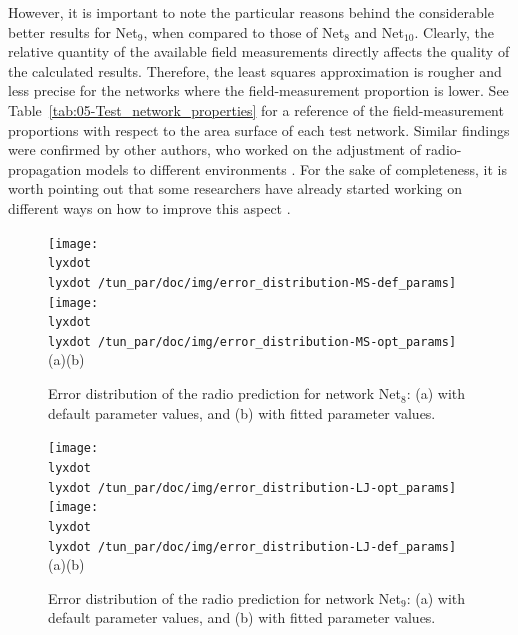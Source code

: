 However, it is important to note the particular reasons behind the
considerable better results for Net$_{9}$, when compared to those
of Net$_{8}$ and Net$_{10}$. Clearly, the relative quantity of the
available field measurements directly affects the quality of the calculated
results. Therefore, the least squares approximation is rougher and
less precise for the networks where the field-measurement proportion
is lower. See Table~\ref{tab:05-Test_network_properties} for a reference
of the field-measurement proportions with respect to the area surface
of each test network. Similar findings were confirmed by other authors,
who worked on the adjustment of radio-propagation models to different
environments \cite{Huang_Online_propagation_model_correction_based_on_PSO_algorithm_in_LTE_SON_system:2012}.
For the sake of completeness, it is worth pointing out that some researchers
have already started working on different ways on how to improve this
aspect \cite{Neuland_Influence_of_Different_Factors_on_X_Map_Estimation_in_LTE:2011,Neuland_Influence_of_positioning_error_on_X_Map_estimation_in_LTE:2011}.

\begin{figure}
\centering

\texttt{[image: \\lyxdot \\lyxdot /tun\_par/doc/img/error\_distribution-MS-def\_params]}\texttt{[image: \\lyxdot \\lyxdot /tun\_par/doc/img/error\_distribution-MS-opt\_params]}\\\hspace*{0.2in}(a)\hspace*{3.2in}(b)

\caption{Error distribution of the radio prediction for network Net$_{8}$:
(a) with default parameter values, and (b) with fitted parameter values.\label{fig:05-Error_distribution_for_Net8}}
\end{figure}


\begin{figure}[h]
\centering

\texttt{[image: \\lyxdot \\lyxdot /tun\_par/doc/img/error\_distribution-LJ-opt\_params]}\texttt{[image: \\lyxdot \\lyxdot /tun\_par/doc/img/error\_distribution-LJ-def\_params]}\\\hspace*{0.2in}(a)\hspace*{3.2in}(b)

\caption{Error distribution of the radio prediction for network Net$_{9}$:
(a) with default parameter values, and (b) with fitted parameter values.\label{fig:05-Error_distribution_for_Net9}}
\end{figure}


